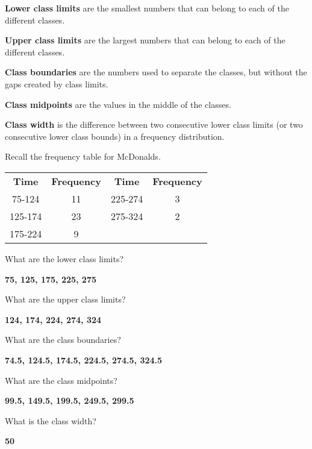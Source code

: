 \documentclass{beamer}
\newcommand{\textsep}{\vspace{0.5mm}}
\begin{document}
\begin{frame}
\begin{definition}
\textbf{Lower class limits} are the smallest numbers that can belong to each of the different classes.
\end{definition}\pause

\begin{definition}
\textbf{Upper class limits} are the largest numbers that can belong to each of the different classes.
\end{definition}\pause

\begin{definition}
\textbf{Class boundaries} are the numbers used to separate the classes, but without the gaps created by class limits.
\end{definition}\pause

\begin{definition}
\textbf{Class midpoints} are the values in the middle of the classes.
\end{definition}\pause

\begin{definition}
\textbf{Class width} is the difference between two consecutive lower class limits (or two consecutive lower class bounds) in a frequency distribution.
\end{definition}
\end{frame}

\begin{frame}
\begin{example}
Recall the frequency table for McDonalds.
\begin{center}
\begin{tabular}{cc|cc}
\textbf{Time} & \textbf{Frequency} & \textbf{Time} & \textbf{Frequency} \\
75-124  & 11 & 225-274 &  3\\
125-174 & 23 & 275-324 &  2\\
175-224 &  9 
\end{tabular}
\end{center}

What are the lower class limits?\pause

\textsep%
\textbf{75, 125, 175, 225, 275}\pause

\textsep%
What are the upper class limits?\pause

\textsep%
\textbf{124, 174, 224, 274, 324}\pause

\textsep%
What are the class boundaries?\pause

\textsep%
\textbf{74.5, 124.5, 174.5, 224.5, 274.5, 324.5}\pause

\textsep%
What are the class midpoints?\pause

\textsep%
\textbf{99.5, 149.5, 199.5, 249.5, 299.5}\pause

\textsep%
What is the class width?\pause

\textsep%
\textbf{50}
\end{example}
\end{frame}
\end{document}
